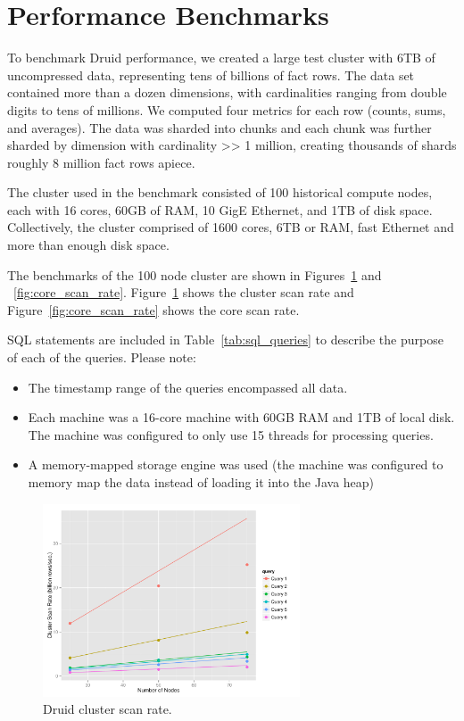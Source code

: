 \documentclass{vldb}
\begin{document}
\section{Performance Benchmarks}
\label{sec:benchmarks}
To benchmark Druid performance, we created a large test cluster with
6TB of uncompressed data, representing tens of billions of fact
rows. The data set contained more than a dozen dimensions, with
cardinalities ranging from double digits to tens of millions. We computed
four metrics for each row (counts, sums, and averages). The data was
sharded into chunks and each chunk was further sharded by dimension
with cardinality >> 1 million, creating thousands of shards roughly 8
million fact rows apiece.

The cluster used in the benchmark consisted of 100 historical compute
nodes, each with 16 cores, 60GB of RAM, 10 GigE Ethernet, and 1TB of
disk space. Collectively, the cluster comprised of 1600 cores, 6TB or
RAM, fast Ethernet and more than enough disk space.

The benchmarks of the 100 node cluster
are shown in Figures~\ref{fig:cluster_scan_rate} and ~\ref{fig:core_scan_rate}.
Figure~\ref{fig:cluster_scan_rate} shows the cluster scan rate and Figure~\ref{fig:core_scan_rate} shows the core scan rate.

SQL statements are included in Table~\ref{tab:sql_queries} to describe the
purpose of each of the queries. Please note:
\begin{itemize}
\item The timestamp range of the queries encompassed all data.
\item Each machine was a 16-core machine with 60GB RAM and 1TB of local
  disk. The machine was configured to only use 15 threads for
  processing queries.
\item A memory-mapped storage engine was used (the machine was configured to memory map the data
  instead of loading it into the Java heap)
\end{itemize}

\begin{figure}
\centering
\includegraphics[width = 3in]{cluster_scan_rate}
\caption{Druid cluster scan rate.}
\label{fig:cluster_scan_rate}
\end{figure}
\end{document}
